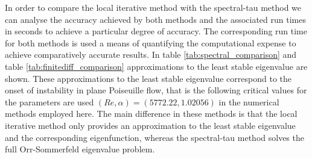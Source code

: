 \documentclass[a4paper, 12pt, twoside, openright]{article}
\numberwithin{equation}{section}
\begin{document}
In order to compare the local iterative method with the spectral-tau method we can analyse the accuracy achieved by both methods and the associated run times in seconds to achieve a particular degree of accuracy. The corresponding run time for both methods is used a means of quantifying the computational expense to achieve comparatively accurate results. In table \ref{tab:spectral_comparison} and table \ref{tab:finitediff_comparison} approximations to the least stable eigenvalue are shown. These approximations to the least stable eigenvalue correspond to the onset of instability in plane Poiseuille flow, that is the following critical values for the parameters are used $(Re,\alpha)=(5772.22,1.02056)$ in the numerical methods employed here. The main difference in these methods is that the local iterative method only provides an approximation to the least stable eigenvalue and the corresponding eigenfunction, whereas the spectral-tau method solves the full Orr-Sommerfeld eigenvalue problem.
\end{document}
